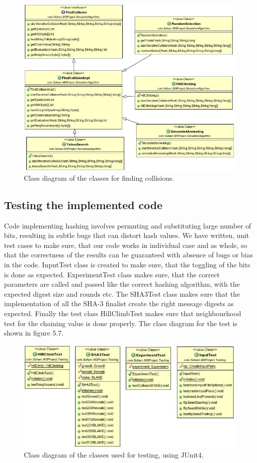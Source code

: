 \begin{figure}
  \begin{center}
    \includegraphics[width=7in]{FindCollisionClasses.jpg}
  \end{center}
  \caption{Class diagram of the classes for finding collisions.}
  \label{fig:UMLCollisionFindingClasses}
\end{figure}

\subsection{Testing the implemented code}

Code implementing hashing involves permuting and substituting large number of bits, resulting in subtle bugs that
can distort hash values. We have written, unit test cases to make sure, that our code works in individual case 
and as whole, so that the correctness of the results can be guaranteed with absence of bugs
or bias in the code. InputTest class is created to make sure, that the toggling of the bits is done as expected.
ExperimentTest class makes sure, that the correct parameters are called and passed like the correct hashing
algorithm, with the expected digest size and rounds etc. The SHA3Test class makes sure that the implementation of 
all the SHA-3 finalist create the right message digests as expected. Finally the test class HillClimbTest makes
sure that neighbourhood test for the chaining value is done properly. The class diagram for the test is shown in
figure 5.7.

\begin{figure}
  \begin{center}
    \includegraphics[width=6.75in]{testingcode.jpg}
  \end{center}
  \caption{Class diagram of the classes used for testing, using JUnit4.}
  \label{fig:UMLJUnitTestClasses}
\end{figure}

